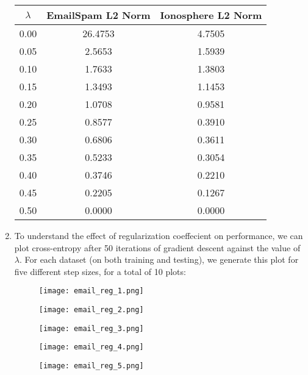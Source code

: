 \documentclass[12pt]{article}
\begin{document}
\begin{enumerate}[label=\alph*.]
	\begin{center}
	\begin{tabular}{| c | c | c |} 
		\hline
	    	$\lambda$ & EmailSpam L2 Norm & Ionosphere L2 Norm \\
		\hline \hline
		0.00 & 26.4753 & 4.7505 \\
		\hline
		0.05 & 2.5653 & 1.5939 \\
		\hline
		0.10 & 1.7633 & 1.3803 \\
		\hline
		0.15 & 1.3493 & 1.1453 \\
		\hline
		0.20 & 1.0708 & 0.9581 \\
		\hline
		0.25 & 0.8577 & 0.3910 \\
		\hline
		0.30 & 0.6806 & 0.3611 \\
		\hline
		0.35 & 0.5233 & 0.3054 \\
		\hline
		0.40 & 0.3746 & 0.2210 \\
		\hline
		0.45 & 0.2205 & 0.1267 \\
		\hline
		0.50 & 0.0000 & 0.0000 \\
		\hline
	    \end{tabular}
	\end{center}

	\item To understand the effect of regularization coeffecient on performance, we can plot cross-entropy after 50 iterations of gradient descent against the value of $\lambda$. For each dataset (on both training and testing), we generate this plot for five different step sizes, for a total of 10 plots:

	\begin{figure}[bp!]
	  \centering
	    \texttt{[image: email\_reg\_1.png]}
	\end{figure}

	\begin{figure}[bp!]
	  \centering
	    \texttt{[image: email\_reg\_2.png]}
	\end{figure}

	\begin{figure}[bp!]
	  \centering
	    \texttt{[image: email\_reg\_3.png]}
	\end{figure}

	\begin{figure}[bp!]
	  \centering
	    \texttt{[image: email\_reg\_4.png]}
	\end{figure}

	\begin{figure}[bp!]
	  \centering
	    \texttt{[image: email\_reg\_5.png]}
	\end{figure}


\end{enumerate}
\end{document}
